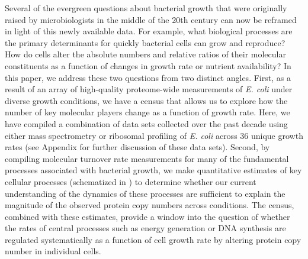 Several of the evergreen questions about bacterial growth that were
originally raised by microbiologists in the middle of the 20th century can
now be reframed in light of this newly available data. For example, what
biological processes are the primary determinants for quickly bacterial
cells can grow and reproduce? How do cells alter the absolute numbers and
relative ratios of their molecular constituents as a function of changes in
growth rate or nutrient availability? In this paper, we address these two
questions from two distinct angles. First, as a result of an array of
high-quality proteome-wide measurements of \textit{E. coli} 
under diverse growth conditions, we have a census that allows us to explore
how the number of key molecular players change as a function of growth rate.
Here, we have compiled a combination of data sets collected over the past decade using either mass spectrometry
\citep{schmidt2016, peebo2015, valgepea2013} or ribosomal profiling
\citep{li2014} of \textit{E. coli} across 36 unique growth rates (see Appendix
 for further discussion of these data sets).
Second, by compiling molecular turnover rate measurements for many of the
fundamental processes associated with bacterial growth, we make quantitative
estimates of key cellular processes (schematized in ) to
determine whether our current understanding of the dynamics of these processes 
are sufficient to explain the magnitude of the observed protein copy numbers
across conditions. The census, combined with these estimates,
provide a window into the question of whether the rates of central processes
such as energy generation or DNA synthesis are regulated systematically as a
function of cell growth rate by altering protein copy number in individual
cells.


